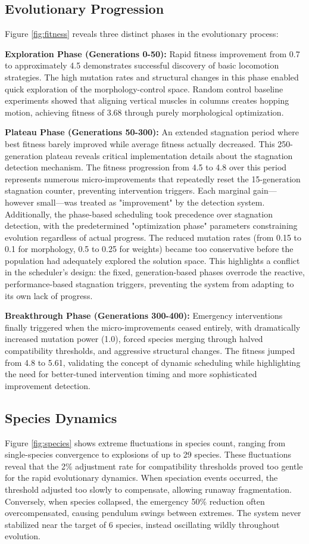 \documentclass[conference]{IEEEtran}
\begin{document}
\subsection{Evolutionary Progression}
Figure \ref{fig:fitness} reveals three distinct phases in the evolutionary process:

\textbf{Exploration Phase (Generations 0-50):} Rapid fitness improvement from 0.7 to approximately 4.5 demonstrates successful discovery of basic locomotion strategies. The high mutation rates and structural changes in this phase enabled quick exploration of the morphology-control space. Random control baseline experiments showed that aligning vertical muscles in columns creates hopping motion, achieving fitness of 3.68 through purely morphological optimization.

\textbf{Plateau Phase (Generations 50-300):} An extended stagnation period where best fitness barely improved while average fitness actually decreased. This 250-generation plateau reveals critical implementation details about the stagnation detection mechanism. The fitness progression from 4.5 to 4.8 over this period represents numerous micro-improvements that repeatedly reset the 15-generation stagnation counter, preventing intervention triggers. Each marginal gain—however small—was treated as "improvement" by the detection system. Additionally, the phase-based scheduling took precedence over stagnation detection, with the predetermined "optimization phase" parameters constraining evolution regardless of actual progress. The reduced mutation rates (from 0.15 to 0.1 for morphology, 0.5 to 0.25 for weights) became too conservative before the population had adequately explored the solution space. This highlights a conflict in the scheduler's design: the fixed, generation-based phases overrode the reactive, performance-based stagnation triggers, preventing the system from adapting to its own lack of progress.

\textbf{Breakthrough Phase (Generations 300-400):} Emergency interventions finally triggered when the micro-improvements ceased entirely, with dramatically increased mutation power (1.0), forced species merging through halved compatibility thresholds, and aggressive structural changes. The fitness jumped from 4.8 to 5.61, validating the concept of dynamic scheduling while highlighting the need for better-tuned intervention timing and more sophisticated improvement detection.

\subsection{Species Dynamics}
Figure \ref{fig:species} shows extreme fluctuations in species count, ranging from single-species convergence to explosions of up to 29 species. These fluctuations reveal that the 2\% adjustment rate for compatibility thresholds proved too gentle for the rapid evolutionary dynamics. When speciation events occurred, the threshold adjusted too slowly to compensate, allowing runaway fragmentation. Conversely, when species collapsed, the emergency 50\% reduction often overcompensated, causing pendulum swings between extremes. The system never stabilized near the target of 6 species, instead oscillating wildly throughout evolution.
\end{document}
